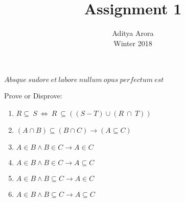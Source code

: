 \documentclass[12pt]{article}
\newenvironment{problem}[2][Problem]{\begin{trivlist}
\item[\hskip \labelsep {\bfseries #1}\hskip \labelsep {\bfseries #2.}]}{\end{trivlist}}
\begin{document}

\title{Assignment 1}%
\author{Aditya Arora\\ %
Winter 2018} %

\maketitle
\begin{center}
    $Absque\ sudore\ et\ labore\ nullum\ opus\ perfectum\ est$
\end{center}
\begin{problem}{1}
Prove or Disprove:
\begin{enumerate}[label=\alph*)]
    \item $ R \subseteq \ S\ \Leftrightarrow \ R \ \subseteq ((S-T)\cup(R\ \cap\ T)) $
    \item $(A \cap B) \subseteq (B \cap C) \longrightarrow (A \subseteq C)$
    \item $A \in B \wedge B \in C \longrightarrow A \in C$
    \item $A \in B \wedge B \in C \longrightarrow A \subseteq C$
    \item $A \in B \wedge B \subseteq C \longrightarrow A \in C$
    \item $A \in B \wedge B \subseteq C \longrightarrow A \subseteq C$
\end{enumerate}
\end{problem}
\end{document}
